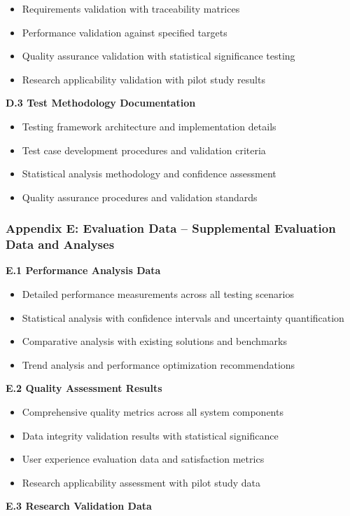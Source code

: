 \documentclass[12pt,a4paper]{report}
\begin{document}
\begin{itemize}
\item Requirements validation with traceability matrices
\item Performance validation against specified targets
\item Quality assurance validation with statistical significance testing
\item Research applicability validation with pilot study results

\end{itemize}
\textbf{D.3 Test Methodology Documentation}

\begin{itemize}
\item Testing framework architecture and implementation details
\item Test case development procedures and validation criteria
\item Statistical analysis methodology and confidence assessment
\item Quality assurance procedures and validation standards

\end{itemize}
\subsubsection{Appendix E: Evaluation Data – Supplemental Evaluation Data and Analyses}

\textbf{E.1 Performance Analysis Data}

\begin{itemize}
\item Detailed performance measurements across all testing scenarios
\item Statistical analysis with confidence intervals and uncertainty quantification
\item Comparative analysis with existing solutions and benchmarks
\item Trend analysis and performance optimization recommendations

\end{itemize}
\textbf{E.2 Quality Assessment Results}

\begin{itemize}
\item Comprehensive quality metrics across all system components
\item Data integrity validation results with statistical significance
\item User experience evaluation data and satisfaction metrics
\item Research applicability assessment with pilot study data

\end{itemize}
\textbf{E.3 Research Validation Data}
\end{document}
